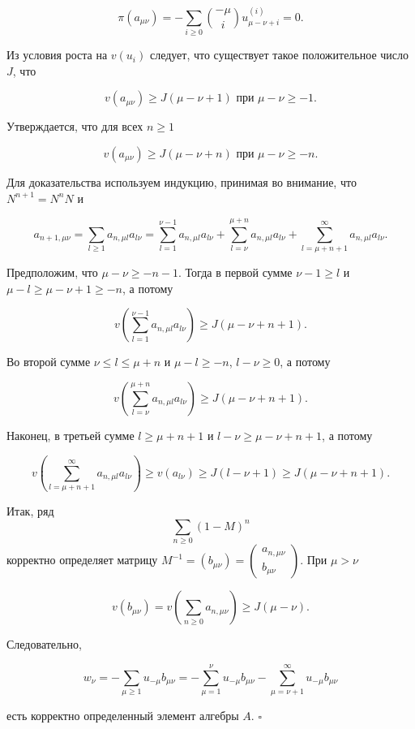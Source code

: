 \documentclass{article}
\theoremstyle{definition}
\theoremstyle{definition} %
\theoremstyle{remark}     %
\theoremstyle{definition}
\theoremstyle{definition}
\theoremstyle{definition}
\theoremstyle{definition}
\theoremstyle{definition}
\theoremstyle{definition}
\theoremstyle{definition}
\theoremstyle{definition}
\begin{document}
\[
\pi(a_{\mu \nu}) = -\sum_{i \geq 0} \binom{-\mu}{i} u_{\mu-\nu+i}^{(i)} = 0.
\]

Из условия роста на \(v(u_i)\) следует, что существует такое положительное число \(J\), что

\[
v(a_{\mu \nu}) \geq J(\mu - \nu + 1) \text{ при } \mu - \nu \geq -1.
\]

Утверждается, что для всех \(n \geq 1\)

\[
v(a_{\mu \nu}) \geq J(\mu - \nu + n) \text{ при } \mu - \nu \geq -n.
\]

Для доказательства используем индукцию, принимая во внимание, что \(N^{n+1} = N^n N\) и

\[
a_{n+1,\mu\nu} = \sum_{l \geq 1} a_{n,\mu l} a_{l\nu} = \sum_{l=1}^{\nu-1} a_{n,\mu l} a_{l\nu} + \sum_{l=\nu}^{\mu+n} a_{n,\mu l} a_{l\nu} + \sum_{l=\mu+n+1}^{\infty} a_{n,\mu l} a_{l\nu}.
\]

Предположим, что \(\mu - \nu \geq -n - 1\). Тогда в первой сумме \(\nu - 1 \geq l\) и \(\mu - l \geq \mu - \nu + 1 \geq -n\), а потому

\[
v\!\left(\sum_{l=1}^{\nu-1} a_{n,\mu l} a_{l\nu}\right) \geq J(\mu - \nu + n + 1).
\]

Во второй сумме \(\nu \leq l \leq \mu + n\) и \(\mu - l \geq -n\), \(l - \nu \geq 0\), а потому

\[
v\!\left(\sum_{l=\nu}^{\mu+n} a_{n,\mu l} a_{l\nu}\right) \geq J(\mu - \nu + n + 1).
\]

Наконец, в третьей сумме \(l \geq \mu + n + 1\) и \(l - \nu \geq \mu - \nu + n + 1\), а потому

\[
v\!\left(\sum_{l=\mu+n+1}^{\infty} a_{n,\mu l} a_{l\nu}\right) \geq v(a_{l\nu}) \geq J(l - \nu + 1) \geq J(\mu - \nu + n + 1).
\]

Итак, ряд \[ \sum_{n \geq 0} (1 - M)^n \] корректно определяет матрицу \( M^{-1} = (b_{\mu\nu}) = \begin{pmatrix} a_{n,\mu\nu} \\ b_{\mu\nu} \end{pmatrix} \). При \(\mu > \nu\)

\[
v(b_{\mu\nu}) = v\!\left(\sum_{n \geq 0} a_{n,\mu\nu}\right) \geq J(\mu - \nu).
\]

Следовательно,

\[
w_{\nu} = -\sum_{\mu \geq 1} u_{-\mu}b_{\mu\nu} = -\sum_{\mu=1}^{\nu} u_{-\mu}b_{\mu\nu} - \sum_{\mu=\nu+1}^{\infty} u_{-\mu}b_{\mu\nu}
\]

есть корректно определенный элемент алгебры \( A \). \( \square \)
\end{document}
